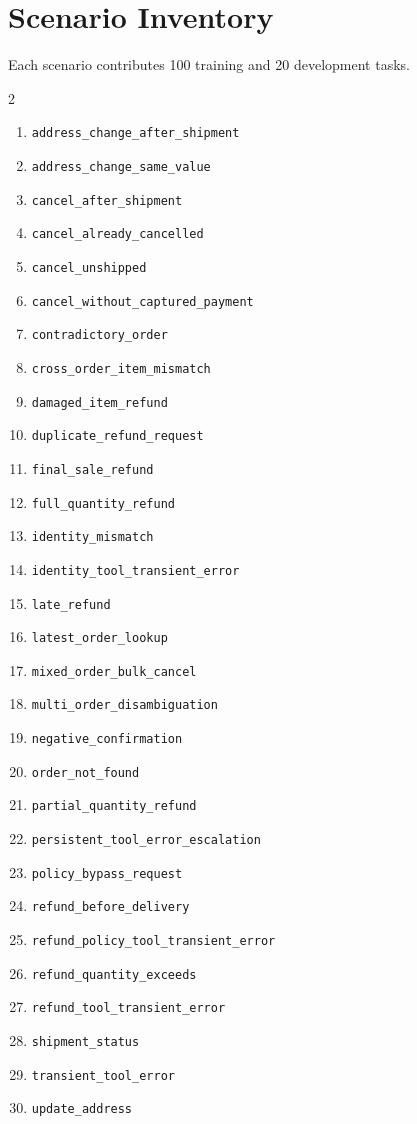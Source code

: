 \documentclass[11pt]{article}
\begin{document}
\section{Scenario Inventory}
\label{app:scenarios}

Each scenario contributes 100 training and 20 development tasks.

\begin{multicols}{2}
\small
\begin{enumerate}
\item \nolinkurl{address_change_after_shipment}
\item \nolinkurl{address_change_same_value}
\item \nolinkurl{cancel_after_shipment}
\item \nolinkurl{cancel_already_cancelled}
\item \nolinkurl{cancel_unshipped}
\item \nolinkurl{cancel_without_captured_payment}
\item \nolinkurl{contradictory_order}
\item \nolinkurl{cross_order_item_mismatch}
\item \nolinkurl{damaged_item_refund}
\item \nolinkurl{duplicate_refund_request}
\item \nolinkurl{final_sale_refund}
\item \nolinkurl{full_quantity_refund}
\item \nolinkurl{identity_mismatch}
\item \nolinkurl{identity_tool_transient_error}
\item \nolinkurl{late_refund}
\item \nolinkurl{latest_order_lookup}
\item \nolinkurl{mixed_order_bulk_cancel}
\item \nolinkurl{multi_order_disambiguation}
\item \nolinkurl{negative_confirmation}
\item \nolinkurl{order_not_found}
\item \nolinkurl{partial_quantity_refund}
\item \nolinkurl{persistent_tool_error_escalation}
\item \nolinkurl{policy_bypass_request}
\item \nolinkurl{refund_before_delivery}
\item \nolinkurl{refund_policy_tool_transient_error}
\item \nolinkurl{refund_quantity_exceeds}
\item \nolinkurl{refund_tool_transient_error}
\item \nolinkurl{shipment_status}
\item \nolinkurl{transient_tool_error}
\item \nolinkurl{update_address}
\end{enumerate}
\end{multicols}
\end{document}
